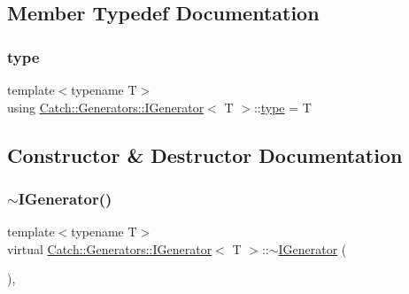\subsection{Member Typedef Documentation}
\mbox{\label{struct_catch_1_1_generators_1_1_i_generator_a1f8677875fe0ff31f39c60d45504b9a5}} 
\subsubsection{\texorpdfstring{type}{type}}
{\footnotesize\ttfamily template$<$typename T$>$ \\
using \mbox{\hyperlink{struct_catch_1_1_generators_1_1_i_generator}{Catch\+::\+Generators\+::\+I\+Generator}}$<$ T $>$\+::\mbox{\hyperlink{struct_catch_1_1_generators_1_1_i_generator_a1f8677875fe0ff31f39c60d45504b9a5}{type}} =  T}



\subsection{Constructor \& Destructor Documentation}
\mbox{\label{struct_catch_1_1_generators_1_1_i_generator_afe5b6eecbbd735e69748d68574611747}} 
\subsubsection{\texorpdfstring{$\sim$\+I\+Generator()}{~IGenerator()}}
{\footnotesize\ttfamily template$<$typename T$>$ \\
virtual \mbox{\hyperlink{struct_catch_1_1_generators_1_1_i_generator}{Catch\+::\+Generators\+::\+I\+Generator}}$<$ T $>$\+::$\sim$\mbox{\hyperlink{struct_catch_1_1_generators_1_1_i_generator}{I\+Generator}} (\begin{DoxyParamCaption}{ }\end{DoxyParamCaption})\hspace{0.3cm}{\ttfamily [virtual]}, {\ttfamily [default]}}



